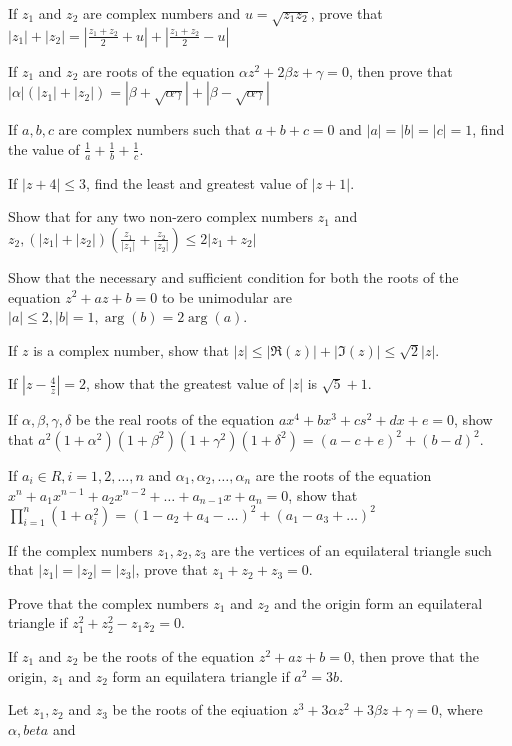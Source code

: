 \item If $z_1$ and $z_2$ are complex numbers and $u = \sqrt{z_1z_2}$, prove that $|z_1| + |z_2| = \left|\frac{z_1 + z_2}{2} +
  u\right| + \left|\frac{z_1 + z_2}{2} - u\right|$
\item If $z_1$ and $z_2$ are roots of the equation $\alpha z^2 + 2\beta z + \gamma = 0$, then prove that $|\alpha|(|z_1| + |z_2|) =
  |\beta + \sqrt{\alpha\gamma}| + |\beta - \sqrt{\alpha\gamma}|$
\item If $a, b, c$ are complex numbers such that $a + b + c = 0$ and $|a| = |b| = |c| = 1$, find the value of $\frac{1}{a} +
  \frac{1}{b} + \frac{1}{c}$.
\item If $|z + 4|\leq 3$, find the least and greatest value of $|z + 1|$.
\item Show that for any two non-zero complex numbers $z_1$ and $z_2, (|z_1| + |z_2|)\left(\frac{z_1}{|z_1|} +
  \frac{z_2}{|z_2|}\right) \leq 2|z_1 + z_2|$
\item Show that the necessary and sufficient condition for both the roots of the equation $z^2 + az + b = 0$ to be unimodular are
  $|a|\leq 2, |b| = 1, \arg(b) = 2\arg(a)$.
\item If $z$ is a complex number, show that $|z|\leq |\Re(z)| + |\Im(z)|\leq \sqrt{2}|z|$.
\item If $|z - \frac{4}{z}| = 2$, show that the greatest value of $|z|$ is $\sqrt{5} + 1$.
\item If $\alpha, \beta, \gamma, \delta$ be the real roots of the equation $ax^4 + bx^3 + cs^2 + dx + e = 0$, show that $a^2(1 +
  \alpha^2)(1 + \beta^2)(1 + \gamma^2)(1 + \delta^2) = (a - c + e)^2 + (b - d)^2$.
\item If $a_i\in R, i = 1, 2, \ldots, n$ and $\alpha_1, \alpha_2, \ldots, \alpha_n$ are the roots of the equation $x^n + a_1x^{n -
  1} + a_2x^{n - 2} + \ldots + a_{n- 1}x + a_n = 0$, show that $\prod_{i = 1}^n(1 + \alpha_i^2) = (1 - a_2 + a_4 - \ldots)^2 + (a_1
  - a_3 + \ldots)^2$
\item If the complex numbers $z_1, z_2, z_3$ are the vertices of an equilateral triangle such that $|z_1| = |z_2| = |z_3|$, prove
  that $z_1 + z_2 + z_3 = 0$.
\item Prove that the complex numbers $z_1$ and $z_2$ and the origin form an equilateral triangle if $z_1^2 + z_2^2 - z_1z_2 = 0$.
\item If $z_1$ and $z_2$ be the roots of the equation $z^2 + az + b = 0$, then prove that the origin, $z_1$ and $z_2$ form an
  equilatera triangle if $a^2 = 3b$.
\item Let $z_1, z_2$ and $z_3$ be the roots of the eqiuation $z^3 + 3\alpha z^2 + 3\beta z + \gamma = 0$, where $\alpha, beta$ and
